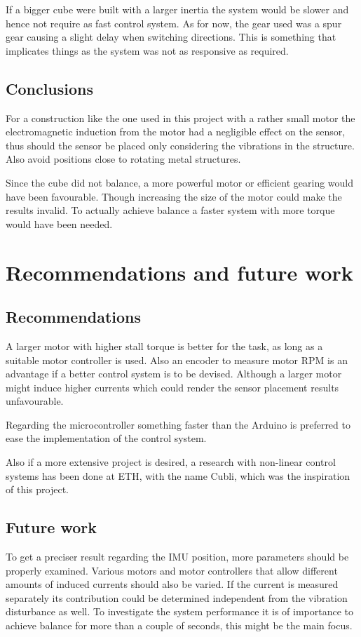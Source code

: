 \documentclass[a4paper,11pt]{kth-mag}
\begin{document}
If a bigger cube were built with a larger inertia the system would be slower and hence not require as fast control system. As for now, the gear used was a spur gear causing a slight delay when switching directions. This is something that implicates things as the system was not as responsive as required. 


\section{Conclusions}
For a construction like the one used in this project with a rather small motor the electromagnetic induction from the motor had a negligible effect on the sensor, thus should the sensor be placed only considering the vibrations in the structure. Also avoid positions close to rotating metal structures. 

Since the cube did not balance, a more powerful motor or efficient gearing would have been favourable. Though increasing the size of the motor could make the results invalid. To actually achieve balance a faster system with more torque would have been needed.


\chapter{Recommendations and future work}

\section{Recommendations}


A larger motor with higher stall torque is better for the task, as long as a suitable motor controller is used. Also an encoder to measure motor RPM is an advantage if a better control system is to be devised. Although a larger motor might induce higher currents which could render the sensor placement results unfavourable.

Regarding the microcontroller something faster than the Arduino is preferred to ease the implementation of the control system.

Also if a more extensive project is desired, a research with non-linear control systems has been done at ETH, with the name Cubli\cite{cubliECC13}, which was the inspiration of this project.

\section{Future work}
To get a preciser result regarding the IMU position, more parameters should be properly examined. Various motors and motor controllers that allow different amounts of induced currents should also be varied. If the current is measured separately its contribution could be determined independent from the vibration disturbance as well.
To investigate the system performance it is of importance to achieve balance for more than a couple of seconds, this might be the main focus.
\end{document}
